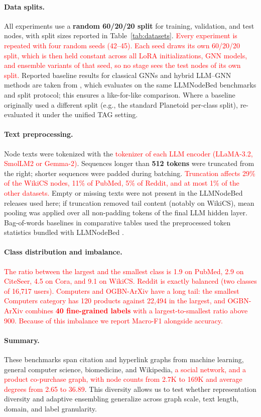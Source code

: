 \documentclass[a4paper,fleqn]{cas-sc}
\newcommand{\revone}[1]{\textcolor{red}{#1}}   %
\begin{document}
\paragraph{Data splits.}
All experiments use a \textbf{random 60/20/20 split} for training, validation, and test nodes, with split sizes reported in Table~\ref{tab:datasets}. \revone{Every experiment is repeated with four random seeds (42--45). Each seed draws its own 60/20/20 split, which is then held constant across all LoRA initializations, GNN models, and ensemble variants of that seed, so no stage sees the test nodes of its own split.} Reported baseline results for classical GNNs and hybrid LLM--GNN methods are taken from \citet{Wu2025LLMNode}, which evaluates on the same LLMNodeBed benchmarks and split protocol; this ensures a like-for-like comparison. Where a baseline originally used a different split (e.g., the standard Planetoid per-class split), \citet{Wu2025LLMNode} re-evaluated it under the unified TAG setting.
\paragraph{Text preprocessing.}
Node texts were tokenized with the \revone{tokenizer of each LLM encoder (LLaMA-3.2, SmolLM2 or Gemma-2)}. Sequences longer than \textbf{512 tokens} were truncated from the right; shorter sequences were padded during batching. \revone{Truncation affects 29\% of the WikiCS nodes, 11\% of PubMed, 5\% of Reddit, and at most 1\% of the other datasets.} Empty or missing texts were not present in the LLMNodeBed releases used here; if truncation removed tail content (notably on WikiCS), mean pooling was applied over all non-padding tokens of the final LLM hidden layer. Bag-of-words baselines in comparative tables used the preprocessed token statistics bundled with LLMNodeBed \citep{Wu2025LLMNode}.
\paragraph{Class distribution and imbalance.}
\revone{The ratio between the largest and the smallest class is 1.9 on PubMed, 2.9 on CiteSeer, 4.5 on Cora, and 9.1 on WikiCS. Reddit is exactly balanced (two classes of 16,717 users). Computers and OGBN-ArXiv have a long tail: the smallest Computers category has 120 products against 22,494 in the largest, and OGBN-ArXiv combines \textbf{40 fine-grained labels} with a largest-to-smallest ratio above 900. Because of this imbalance we report Macro-F1 alongside accuracy.}
\paragraph{Summary.}
These benchmarks span citation and hyperlink graphs from machine learning, general computer science, biomedicine, and Wikipedia, \revone{a social network, and a product co-purchase graph, with node counts from 2.7K to 169K and average degrees from 2.65 to 36.89}. This diversity allows us to test whether representation diversity and adaptive ensembling generalize across graph scale, text length, domain, and label granularity.
\end{document}
